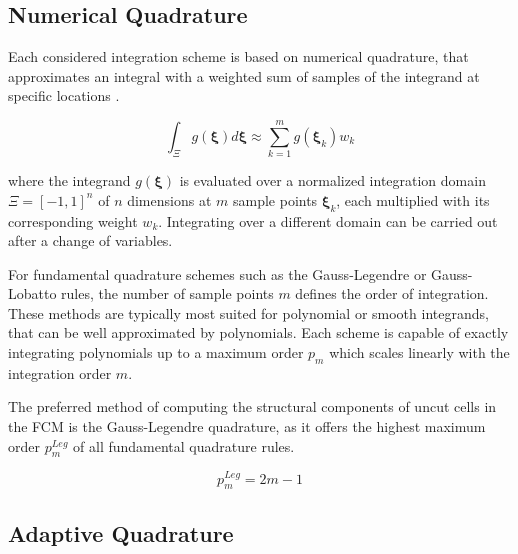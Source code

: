 \subsection*{Numerical Quadrature}
\label{subsection:numerical_quadrature}

Each considered integration scheme is based on numerical quadrature, that approximates an integral with a weighted sum of samples of the integrand at specific locations \cite{Atkinson1988}.

\begin{equation}
	\int_{\Xi} g(\boldsymbol{\xi}) d\boldsymbol{\xi} \approx \sum_{k=1}^m g(\boldsymbol{\xi}_k) w_k
\end{equation}

where the integrand $g(\boldsymbol{\xi})$ is evaluated over a normalized integration domain $\Xi = [-1,1]^n$ of $n$ dimensions at $m$ sample points $\boldsymbol{\xi}_k$, each multiplied with its corresponding weight $w_k$. Integrating over a different domain can be carried out after a change of variables.

For fundamental quadrature schemes such as the Gauss-Legendre or Gauss-Lobatto rules, the number of sample points $m$ defines the order of integration. These methods are typically most suited for polynomial or smooth integrands, that can be well approximated by polynomials. Each scheme is capable of exactly integrating polynomials up to a maximum order $p_m$ which scales linearly with the integration order $m$.

The preferred method of computing the structural components of uncut cells in the FCM is the Gauss-Legendre quadrature, as it offers the highest maximum order $p_m^{Leg}$ of all fundamental quadrature rules.

\begin{equation} \label{eq:gauss_legendre_maximum_order}
	p_m^{Leg} = 2m - 1
\end{equation}

\subsection*{Adaptive Quadrature}
\label{subsection:adaptive_quadrature}

